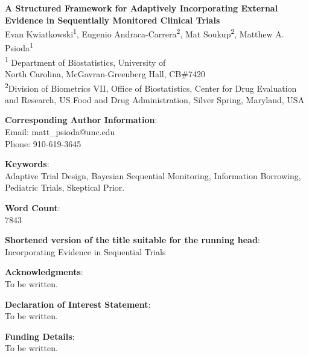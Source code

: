 \documentclass[12pt]{article}
\begin{document}
	\begin{center}
		\textbf{A Structured Framework for Adaptively Incorporating External\\ 
		         Evidence in Sequentially Monitored Clinical Trials} \\

		\vspace{1cm}
			Evan Kwiatkowski\textsuperscript{1}, Eugenio Andraca-Carrera\textsuperscript{2}, 
			Mat Soukup\textsuperscript{2}, Matthew A. Psioda\textsuperscript{1}\\

		\vspace{1cm}
			\textsuperscript{1} Department of Biostatistics, University of \\
			North Carolina, McGavran-Greenberg Hall, CB\#7420 \\

		\vspace{1cm}
			\textsuperscript{2}Division of Biometrics VII, Office of Biostatistics, Center for Drug Evaluation and Research, US Food and Drug Administration, Silver Spring, Maryland, USA
	\end{center}

\vspace{1cm}
\noindent
\textbf{Corresponding Author Information}: \\
Email: matt\_psioda@unc.edu \\
Phone: 910-619-3645

\vspace{1cm}
\noindent
\textbf{Keywords}: \\
Adaptive Trial Design, Bayesian Sequential Monitoring, Information Borrowing, Pediatric Trials, Skeptical Prior.

\vspace{1cm}
\noindent
\textbf{Word Count}: \\
7843

\vspace{1cm}
\noindent
\textbf{Shortened version of the title suitable for the running head}: \\
Incorporating Evidence in Sequential Trials


\vspace{1cm}
\noindent
\textbf{Acknowledgments}: \\
To be written.

\vspace{1cm}
\noindent
\textbf{Declaration of Interest Statement}: \\
To be written.


\vspace{1cm}
\noindent
\textbf{Funding Details}: \\
To be written.
\end{document}
